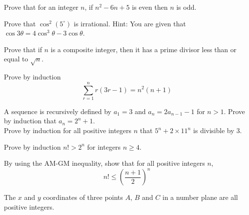 \documentclass[11pt, a4paper, oneside]{exam}
\theoremstyle{definition}\newtheorem{define}{Definition}[section]
\theoremstyle{remark}\newtheorem{remark}{Remark}
\theoremstyle{definition}\newtheorem{example}{Example}[subsection]
\theoremstyle{definition}\newtheorem{notation}{Notation}[section]
\theoremstyle{definition}\newtheorem{theorem}{Theorem}[section]
\theoremstyle{definition}\newtheorem{corollary}{Corollary}[section]
\begin{document}
\begin{questions}

\question[2] Prove that for an integer $n$, if $n^2 - 6n + 5$ is even then $n$ is odd.

\question[2] Prove that $\cos^2(5^\circ)$ is irrational. Hint: You are given that $\cos 3\theta = 4\cos^3\theta - 3\cos\theta$.

\question[2] Prove that if $n$ is a composite integer, then it has a prime divisor less than or equal to $\sqrt{n}$.

\question[3] Prove by induction \[ \sum_{r=1}^n r(3r-1) = n^2(n+1) \]

\question[4] A sequence is recursively defined by $a_1 = 3$ and $a_n = 2a_{n-1} - 1$ for $n >1$. Prove by induction that $a_n = 2^n + 1$.\\

\question[3] Prove by induction for all positive integers $n$ that $5^n + 2\times11^n$ is divisible by 3.

\question[3] Prove by induction $n! > 2^n$ for integers $n\geq 4$.

\question
{}

\question[3] By using the AM-GM inequality, show that for all positive integers $n$, 
\[ n! \leq \left(\frac{n+1}{2}\right)^n \]


\question The $x$ and $y$ coordinates of three points $A$, $B$ and $C$ in a number plane are all positive integers.
\end{questions}
\end{document}
